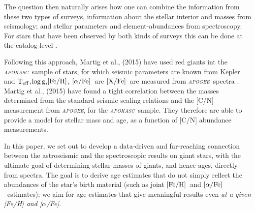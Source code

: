 \documentclass[12pt, preprint]{aastex}
\newcommand{\project}[1]{\textsl{#1}}
\newcommand{\apogee}{\project{\textsc{apogee}}}
\newcommand{\apokasc}{\project{\textsc{apokasc}}}
\newcommand{\teff}{\mbox{$\rm T_{eff}$}}
\newcommand{\feh}{\mbox{$\rm [Fe/H]$}}
\newcommand{\xfe}{\mbox{$\rm [X/Fe]$}}
\newcommand{\alphafe}{\mbox{$\rm [\alpha/Fe]$}}
\newcommand{\logg}{\mbox{$\rm \log g$}}
\begin{document}
The question then naturally arises how one can combine the information from these two types of surveys, information about the stellar interior and masses from seismology; and
stellar parameters and element-abundances from spectroscopy. For stars that have been observed by both kinds of surveys this can be done at the catalog level \citep{Martig2014}.

Following this approach, Martig et al., (2015) have used red giants int the \apokasc\ sample of stars, for which seismic parameters are known from Kepler \citep{P2014} and \teff,\logg,\feh, \alphafe\  are \xfe\ are measured from \apogee\ spectra \citep{Ahn2014}. Martig et al., (2015) have found a tight correlation between the masses determined from the standard seismic scaling relations and the [C/N] measurement from \apogee, for the \apokasc\ sample.  They therefore are able to provide a model for stellar mass and age, as a function of [C/N] abundance measurements. 

In this paper, we set out to develop a data-driven and far-reaching connection between the astroseismic and the spectroscopic results on giant stars, with the ultimate goal of determining stellar masses of giants, and hence ages, directly from spectra. The goal is to derive age estimates that do not simply reflect the abundances of the star's birth material (such as joint \feh\ and \alphafe\ estimates); we aim for age estimates that give meaningful results even {\sl at a given [Fe/H] and [$\alpha$/Fe]}.


\end{document}
